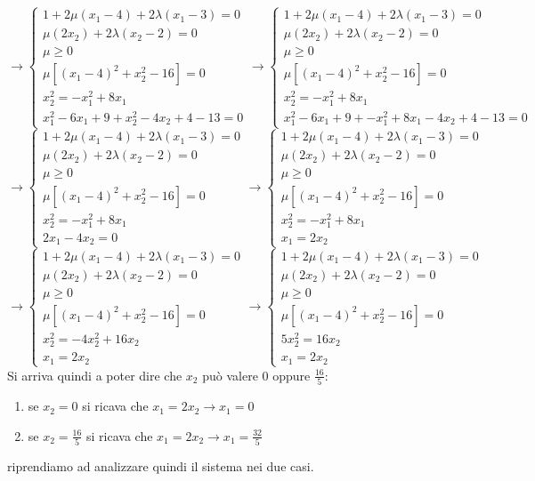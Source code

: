 \documentclass[a4paper,12pt, oneside]{book}
\begin{document}
\[\to
  \begin{cases}
    1+2\mu(x_1-4)+2\lambda(x_1-3)=0\\
    \mu(2x_2)+2\lambda(x_2-2)=0\\
    \mu\geq 0\\
    \mu[(x_1-4)^2+x_2^2-16]=0\\
    x_2^2=-x_1^2+8x_1 \\
    x_1^2-6x_1+9+x_2^2-4x_2+4-13=0
  \end{cases}\to
   \begin{cases}
    1+2\mu(x_1-4)+2\lambda(x_1-3)=0\\
    \mu(2x_2)+2\lambda(x_2-2)=0\\
    \mu\geq 0\\
    \mu[(x_1-4)^2+x_2^2-16]=0\\
    x_2^2=-x_1^2+8x_1 \\
    x_1^2-6x_1+9+-x_1^2+8x_1-4x_2+4-13=0
  \end{cases}
\]
\[\to
  \begin{cases}
    1+2\mu(x_1-4)+2\lambda(x_1-3)=0\\
    \mu(2x_2)+2\lambda(x_2-2)=0\\
    \mu\geq 0\\
    \mu[(x_1-4)^2+x_2^2-16]=0\\
    x_2^2=-x_1^2+8x_1 \\
    2x_1-4x_2=0
  \end{cases}\to
  \begin{cases}
    1+2\mu(x_1-4)+2\lambda(x_1-3)=0\\
    \mu(2x_2)+2\lambda(x_2-2)=0\\
    \mu\geq 0\\
    \mu[(x_1-4)^2+x_2^2-16]=0\\
    x_2^2=-x_1^2+8x_1 \\
    x_1=2x_2
  \end{cases}
\]
\[\to
  \begin{cases}
    1+2\mu(x_1-4)+2\lambda(x_1-3)=0\\
    \mu(2x_2)+2\lambda(x_2-2)=0\\
    \mu\geq 0\\
    \mu[(x_1-4)^2+x_2^2-16]=0\\
    x_2^2=-4x_2^2+16x_2 \\
    x_1=2x_2
  \end{cases}\to
  \begin{cases}
    1+2\mu(x_1-4)+2\lambda(x_1-3)=0\\
    \mu(2x_2)+2\lambda(x_2-2)=0\\
    \mu\geq 0\\
    \mu[(x_1-4)^2+x_2^2-16]=0\\
    5x_2^2=16x_2 \\
    x_1=2x_2
  \end{cases}
\]
Si arriva quindi a poter dire che $x_2$ può valere 0 oppure
$\frac{16}{5}$:
\begin{enumerate}
  \item se $x_2=0$ si ricava che $x_1=2x_2\to x_1=0$
  \item se $x_2=\frac{16}{5}$ si ricava che $x_1=2x_2\to x_1=\frac{32}{5}$
\end{enumerate}
riprendiamo ad analizzare quindi il sistema nei due casi.
\end{document}
